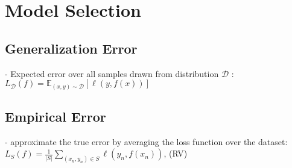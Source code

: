 \section{Model Selection}




\subsection*{Generalization Error}


- Expected error over all samples drawn from distribution $\mathscr{D}$ :
$
L_{\mathscr{D}}(f)=\mathbb{E}_{(x, y) \sim \mathscr{D}}[\ell(y, f(x))]
$





\subsection*{Empirical Error}
- approximate the true error by averaging the loss function over the dataset: 
$
L_{S}(f)=\frac{1}{|S|} \sum_{(x_{n}, y_{n}) \in S} \ell(y_{n}, f(x_{n}))
$,
(RV)



